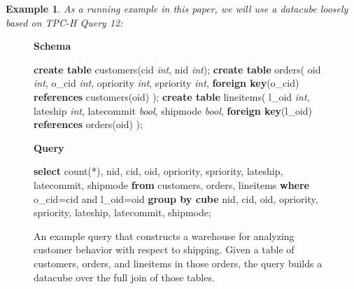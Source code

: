 \documentclass{sig-alternate}
\newtheorem{example}{Example}
\begin{document}
\begin{example}\textit
As a running example in this paper, we will use a datacube loosely based on TPC-H\cite{tpch} Query 12:
\end{example}
\begin{figure}
\begin{center}
\textbf{Schema}
\end{center}
\begin{algorithmic}
\STATE \textbf{create table} customers(cid \textit{int}, nid \textit{int}); 
\STATE \textbf{create table} orders(
\STATE \hspace*{0.1in} oid \textit{int}, o\_cid \textit{int}, opriority \textit{int}, spriority \textit{int},
\STATE \hspace*{0.1in}  \textbf{foreign key}(o\_cid) \textbf{references} customers(oid)
\STATE );
\STATE \textbf{create table} lineitems(
\STATE \hspace*{0.1in} l\_oid \textit{int}, lateship \textit{int}, latecommit \textit{bool}, shipmode \textit{bool},
\STATE \hspace*{0.1in} \textbf{foreign key}(l\_oid) \textbf{references} orders(oid)
\STATE );
\end{algorithmic}
\begin{center}
\textbf{Query}
\end{center}
\begin{algorithmic}
\STATE \textbf{select} count(*),
\STATE \hspace*{0.1in} nid, cid, oid, opriority, spriority, 
\STATE \hspace*{0.1in} lateship, latecommit, shipmode 
\STATE \textbf{from} customers, orders, lineitems 
\STATE \textbf{where} o\_cid=cid and l\_oid=oid 
\STATE \textbf{group by cube} 
\STATE \hspace*{0.1in} nid, cid, oid, opriority, spriority, 
\STATE \hspace*{0.1in} lateship, latecommit, shipmode;
\end{algorithmic}
\caption{An example query that constructs a warehouse for analyzing customer behavior with respect to shipping.  Given a table of customers, orders, and lineitems in those orders, the query builds a datacube over the full join of those tables.}
\label{fig:example}  
\end{figure}
\end{document}
